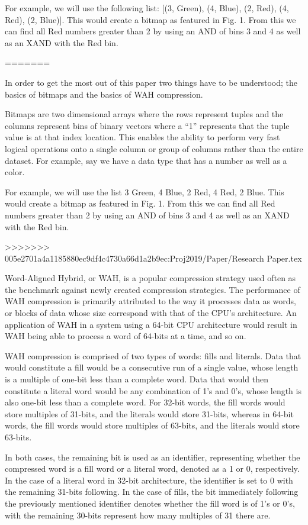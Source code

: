 \documentclass{article}
\begin{document}
For example, we will use the following list: [(3, Green), (4, Blue), (2, Red), (4, Red), (2, Blue)]. 
This would create a bitmap as featured in Fig. 1. From this we can find all Red numbers greater than 2 by using an AND of bins 3 and 4 as well as an XAND with the Red bin. \par
=======

In order to get the most out of this paper two things have to be understood; the basics of bitmaps and the basics of WAH compression. \par

Bitmaps are two dimensional arrays where the rows represent tuples and the columns represent bins of binary vectors where a “1” represents that the tuple value is at that index location. This enables the ability to perform very fast logical operations onto a single column or group of columns rather than the entire dataset. For example, say we have a data type that has a number as well as a color. \par

For example, we will use the list 3 Green, 4 Blue, 2 Red, 4 Red, 2 Blue. This would create a bitmap as featured in Fig. 1. From this we can find all Red numbers greater than 2 by using an AND of bins 3 and 4 as well as an XAND with the Red bin. \par
>>>>>>> 005e2701a4a1185880ec9df4c4730a66d1a2b9ec:Proj2019/Paper/Research Paper.tex


Word-Aligned Hybrid, or WAH, is a popular compression strategy used often as the benchmark against newly created compression strategies. The performance of WAH compression is primarily attributed to the way it processes data as words, or blocks of data whose size correspond with that of the CPU's architecture. An application of WAH in a system using a 64-bit CPU architecture would result in WAH being able to process a word of 64-bits at a time, and so on.
\par 
WAH compression is comprised of two types of words: fills and literals. Data that would constitute a fill would be a consecutive run of a single value, whose length is a multiple of one-bit less than a complete word. Data that would then constitute a literal word would be any combination of 1's and 0's, whose length is also one-bit less than a complete word. For 32-bit words, the fill words would store multiples of 31-bits, and the literals would store 31-bits, whereas in 64-bit words, the fill words would store multiples of 63-bits, and the literals would store 63-bits. 
\par 
In both cases, the remaining bit is used as an identifier, representing whether the compressed word is a fill word or a literal word, denoted as a 1 or 0, respectively. In the case of a literal word in 32-bit architecture, the identifier is set to 0 with the remaining 31-bits following. In the case of fills, the bit immediately following the previously mentioned identifier denotes whether the fill word is of 1’s or 0’s, with the remaining 30-bits represent how many multiples of 31 there are. \par
\end{document}
